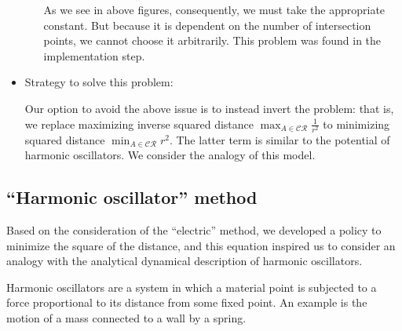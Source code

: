 \documentclass{article}
\numberwithin{equation}{section}
\theoremstyle{definition}
\newcommand{\CR}{\mathcal{CR}}
\begin{document}
\begin{itemize}
\begin{itemize}
As we see in above figures, consequently, we must take the appropriate constant. But because it is dependent on the number of intersection points, we cannot choose it arbitrarily. This problem was found in the implementation step. 
        
    \end{itemize}
    \item
    Strategy to solve this problem:
    
    Our option to avoid the above issue is to instead invert the problem: that is, we replace maximizing inverse squared distance $\max_{A\in\CR}\frac{1}{r^{2}}$ to minimizing squared distance $\min_{A\in\CR}r^{2}$. The latter term is similar to the potential of harmonic oscillators. 
    We consider the analogy of this model.
\end{itemize}



\subsection{``Harmonic oscillator'' method}

Based on the consideration of the ``electric''  method, we developed a policy to minimize the square of the distance, and this equation inspired us to consider an analogy with the analytical dynamical description of harmonic oscillators.

Harmonic oscillators are a system in which a material point is subjected to a force proportional to its distance from some fixed point. An example is the motion of a mass connected to a wall by a spring. \\
\end{document}
